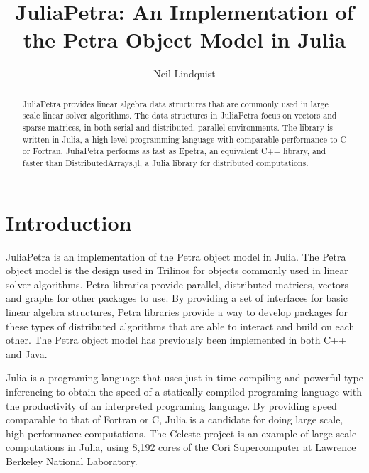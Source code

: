\documentclass[acmsmall]{acmart}
\title{JuliaPetra: An Implementation of the Petra Object Model in Julia}
\author{Neil Lindquist}
\begin{document}
\begin{abstract}
JuliaPetra provides linear algebra data structures that are commonly used in large scale linear solver algorithms.
The data structures in JuliaPetra focus on vectors and sparse matrices, in both serial and
distributed, parallel environments.
The library is written in Julia, a high level programming language with comparable performance to C or Fortran.
JuliaPetra performs as fast as Epetra, an equivalent C++ library, and faster than DistributedArrays.jl, a Julia
library for distributed computations.
\end{abstract}

\maketitle


\section{Introduction}

JuliaPetra is an implementation of the Petra object model in Julia.
The Petra object model is the design used in Trilinos for objects commonly used in linear solver algorithms.
\cite{OverviewOfTrilinos}
Petra libraries provide parallel, distributed matrices, vectors and graphs for other packages to use.
By providing a set of interfaces for basic linear algebra structures, Petra libraries provide a way
to develop packages for these types of distributed algorithms that are able to interact and build on each other.
The Petra object model has previously been implemented in both C++ and Java.

Julia is a programing language that uses just in time compiling and powerful type inferencing
to obtain the speed of a statically compiled programing language with the productivity of an
interpreted programing language. \cite{JuliaFreshApproach}
By providing speed comparable to that of Fortran or C, Julia is a candidate for doing large scale,
high performance computations.
The Celeste project is an example of large scale computations in Julia,
using 8,192 cores of the Cori Supercomputer
at Lawrence Berkeley National Laboratory. \cite{JuliaFreshApproach}
\end{document}
